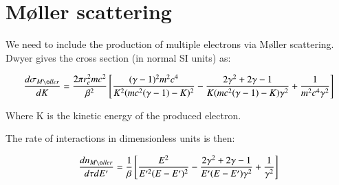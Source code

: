 \documentclass[]{article}
\begin{document}
%
%

\section{M\o ller scattering}

We need to include the production of multiple electrons via M\o ller scattering. Dwyer gives the cross section (in normal SI units) as:

\begin{equation} 
\frac{d\sigma_{M\o ller}}{d K} = \frac{2\pi r_e^2 m c^2}{\beta^2}\left[  \frac{(\gamma-1)^2m^2c^4}{K^2(mc^2(\gamma-1)-K)^2} - \frac{2\gamma^2 + 2\gamma -1}{K(mc^2(\gamma-1)-K)\gamma^2}  + \frac{1}{m^2c^4\gamma^2}  \right]
\end{equation}

Where K is the kinetic energy of the produced electron.

The rate of interactions in dimensionless units is then:

\begin{equation} 
\label{dimensionless_moller_scattering_eq}
\frac{dn_{M\o ller}}{d\tau d E'} = \frac{1}{\beta} \left[  \frac{E^2}{E'^2(E-E')^2} - \frac{2\gamma^2 + 2\gamma -1}{E'(E-E')\gamma^2}  + \frac{1}{\gamma^2}  \right]
\end{equation}
\end{document}
